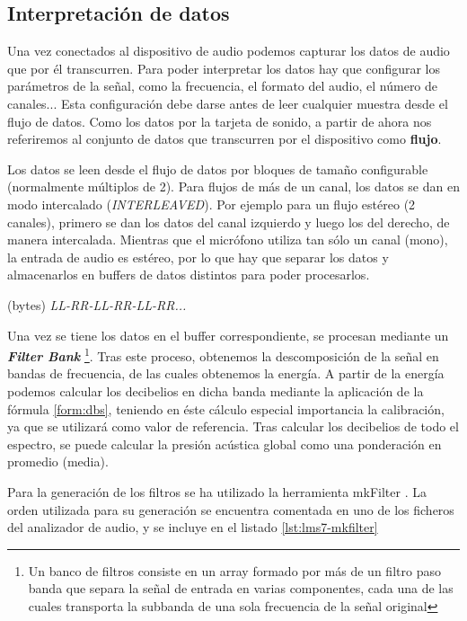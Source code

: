 \subsection{Interpretación de datos}

Una vez conectados al dispositivo de audio podemos capturar los datos de audio que por él transcurren. Para poder interpretar los datos hay que configurar los parámetros de la señal, como la frecuencia, el formato del audio, el número de canales... Esta configuración debe darse antes de leer cualquier muestra desde el flujo de datos. Como los datos  por la tarjeta de sonido, a partir de ahora nos referiremos al conjunto de datos que transcurren por el dispositivo como \textbf{flujo}.

Los datos se leen desde el flujo de datos por bloques de tamaño configurable (normalmente múltiplos de 2). Para flujos de más de un canal, los datos se dan en modo intercalado (\textit{INTERLEAVED}). Por ejemplo para un flujo estéreo (2 canales), primero se dan los datos del canal izquierdo y luego los del derecho, de manera intercalada. Mientras que el micrófono utiliza tan sólo un canal (mono), la entrada de audio es estéreo, por lo que hay que separar los datos y almacenarlos en buffers de datos distintos para poder procesarlos.

\begin{center}
(bytes) \textit{LL-RR-LL-RR-LL-RR...}
\end{center}

Una vez se tiene los datos en el buffer correspondiente, se procesan mediante un \textbf{\textit{Filter Bank}} \cite{FilterBank} \footnote{Un banco de filtros consiste en un array formado por más de un filtro paso banda que separa la señal de entrada en varias componentes, cada una de las cuales transporta la subbanda de una sola frecuencia de la señal original}. Tras este proceso, obtenemos la descomposición de la señal en bandas de frecuencia, de las cuales obtenemos la energía. A partir de la energía podemos calcular los decibelios en dicha banda mediante la aplicación de la fórmula \ref{form:dbs}, teniendo en éste cálculo especial importancia la calibración, ya que se utilizará como valor de referencia. Tras calcular los decibelios de todo el espectro, se puede calcular la presión acústica global como una ponderación en promedio (media).

Para la generación de los filtros se ha utilizado la herramienta mkFilter \cite{mkfilter}. La orden utilizada para su generación se encuentra comentada en uno de los ficheros del analizador de audio, y se incluye en el listado \ref{lst:lms7-mkfilter} \\

